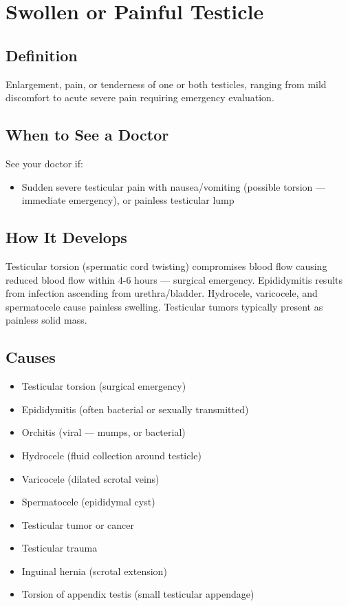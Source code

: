 \chapter{Swollen or Painful Testicle}

\section*{Definition}
Enlargement, pain, or tenderness of one or both testicles, ranging from mild discomfort to acute severe pain requiring emergency evaluation.

\section*{When to See a Doctor}
See your doctor if:
\begin{itemize}
  \item Sudden severe testicular pain with nausea/vomiting (possible torsion — immediate emergency), or painless testicular lump
\end{itemize}

\section*{How It Develops}
Testicular torsion (spermatic cord twisting) compromises blood flow causing reduced blood flow within 4-6 hours — surgical emergency. Epididymitis results from infection ascending from urethra/bladder. Hydrocele, varicocele, and spermatocele cause painless swelling. Testicular tumors typically present as painless solid mass.

\section*{Causes}
\begin{itemize}
  \item Testicular torsion (surgical emergency)
  \item Epididymitis (often bacterial or sexually transmitted)
  \item Orchitis (viral — mumps, or bacterial)
  \item Hydrocele (fluid collection around testicle)
  \item Varicocele (dilated scrotal veins)
  \item Spermatocele (epididymal cyst)
  \item Testicular tumor or cancer
  \item Testicular trauma
  \item Inguinal hernia (scrotal extension)
  \item Torsion of appendix testis (small testicular appendage)
\end{itemize}

